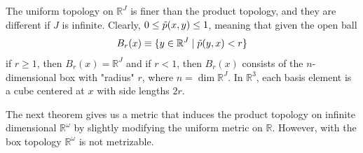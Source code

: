 \documentclass{article}
\begin{document}
  The uniform topology on $\mathbb{R}^J$ is finer than the product topology, and they are different if $J$ is infinite. Clearly, $0 \leq \Tilde{p} (x, y) \leq 1$, meaning that given the open ball
  \[B_r (x) \equiv \{y \in \mathbb{R}^J \;|\; \Tilde{p}(y, x) < r\}\]
  if $r \geq 1$, then $B_r (x) = \mathbb{R}^J$ and if $r<1$, then $B_r (x)$ consists of the $n$-dimensional box with "radius" $r$, where $n = \dim{\mathbb{R}^J}$. In $\mathbb{R}^3$, each basis element is a cube centered at $x$ with side lengths $2r$.
  \begin{center}
  \end{center}

  The next theorem gives us a metric that induces the product topology on infinite dimensional $\mathbb{R}^\omega$ by slightly modifying the uniform metric on $\mathbb{R}$. However, with the box topology $\mathbb{R}^\omega$ is not metrizable. 
\end{document}
